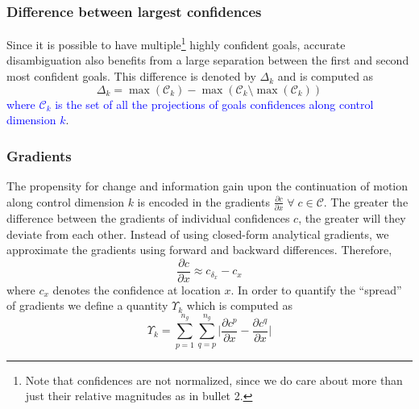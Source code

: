 \documentclass[conference]{IEEEtran}
\newcommand{\argmax}{\arg\!\max}
\begin{document}
\subsubsection{Difference between largest confidences}
%
Since it is possible to have multiple\footnote{Note that confidences are not normalized, since we do care about more than just their relative magnitudes as in bullet 2.} highly confident goals, accurate disambiguation also benefits from a large separation between the first and second most confident goals. 
This difference is denoted by $\Delta_{k}$ and is computed as
\begin{equation*}
\Delta_{k} = \max(\mathcal{C}_k) - \max(\mathcal{C}_k \setminus {\max(\mathcal{C}_k)})
\end{equation*}
\textcolor{blue}{where $\mathcal{C}_k$ is the set of all the projections of goals confidences along control dimension $k$}.
\subsubsection{Gradients}
The propensity for change and information gain upon the continuation of motion along control dimension $k$ is encoded in the gradients $\frac{\partial c}{\partial x}\; \forall\; c\in \mathcal{C}$. The greater the difference between the gradients of individual confidences $c$, the greater will they deviate from each other.  Instead of using closed-form analytical gradients, we approximate the gradients using forward and backward differences. Therefore, 
\begin{equation*}
\frac{\partial c}{\partial x} \approx c_{\delta_x} - c_{x} 
\end{equation*}
where $c_x$ denotes the confidence at location $x$.
In order to quantify the ``spread'' of gradients we define a quantity $\Upsilon_{k}$ which is computed as 
\begin{equation*}
\Upsilon_{k} = \sum_{p=1}^{n_g}\sum_{q=p}^{n_g}\Big \lvert\frac{\partial c^p}{\partial x} - \frac{\partial c^q}{\partial x}\Big \rvert
\end{equation*}
\end{document}
